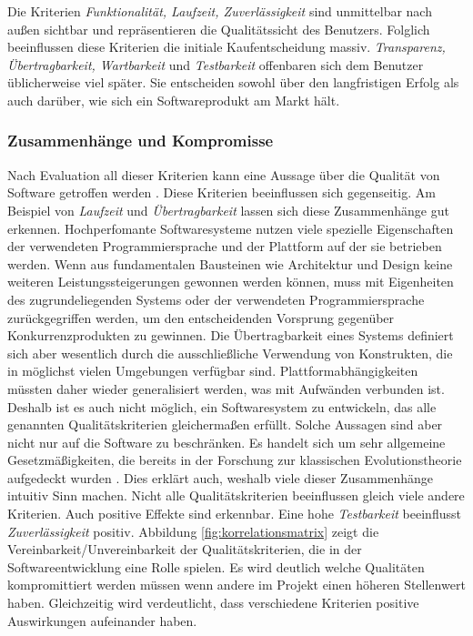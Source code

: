 Die Kriterien \textit{Funktionalität, Laufzeit, Zuverlässigkeit} sind unmittelbar nach außen sichtbar und repräsentieren die Qualitätssicht des Benutzers. Folglich beeinflussen diese Kriterien die initiale Kaufentscheidung massiv. \textit{Transparenz, Übertragbarkeit, Wartbarkeit} und \textit{Testbarkeit} offenbaren sich dem Benutzer üblicherweise viel später. Sie entscheiden sowohl über den langfristigen Erfolg als auch darüber, wie sich ein Softwareprodukt am Markt hält.

\subsubsection{Zusammenhänge und Kompromisse} 
Nach Evaluation all dieser Kriterien kann eine Aussage über die Qualität von Software getroffen werden \cite{hoffmann_software-qualitat_2013}. Diese Kriterien beeinflussen sich gegenseitig. Am Beispiel von \textit{Laufzeit} und \textit{Übertragbarkeit} lassen sich diese Zusammenhänge gut erkennen. Hochperfomante Softwaresysteme nutzen viele spezielle Eigenschaften der verwendeten Programmiersprache und der Plattform auf der sie betrieben werden. Wenn aus fundamentalen Bausteinen wie Architektur und Design keine weiteren Leistungssteigerungen gewonnen werden können, muss mit Eigenheiten des zugrundeliegenden Systems oder der verwendeten Programmiersprache zurückgegriffen werden, um den entscheidenden Vorsprung gegenüber Konkurrenzprodukten zu gewinnen. Die Übertragbarkeit eines Systems definiert sich aber wesentlich durch die ausschließliche Verwendung von Konstrukten, die in möglichst vielen Umgebungen verfügbar sind. Plattformabhängigkeiten müssten daher wieder generalisiert werden, was mit Aufwänden verbunden ist.\\
Deshalb ist es auch nicht möglich, ein Softwaresystem zu entwickeln, das alle genannten Qualitätskriterien gleichermaßen erfüllt. Solche Aussagen sind aber nicht nur auf die Software zu beschränken. Es handelt sich um sehr allgemeine Gesetzmäßigkeiten, die bereits in der Forschung zur klassischen Evolutionstheorie aufgedeckt wurden \cite{hoffmann_software-qualitat_2013}. Dies erklärt auch, weshalb viele dieser Zusammenhänge intuitiv Sinn machen. Nicht alle Qualitätskriterien beeinflussen gleich viele andere Kriterien. Auch positive Effekte sind erkennbar. Eine hohe \textit{Testbarkeit} beeinflusst \textit{Zuverlässigkeit} positiv. Abbildung \ref{fig:korrelationsmatrix} zeigt die Vereinbarkeit/Unvereinbarkeit der Qualitätskriterien, die in der Softwareentwicklung eine Rolle spielen. Es wird deutlich welche Qualitäten kompromittiert werden müssen wenn andere im Projekt einen höheren Stellenwert haben. Gleichzeitig wird verdeutlicht, dass verschiedene Kriterien positive Auswirkungen aufeinander haben.

